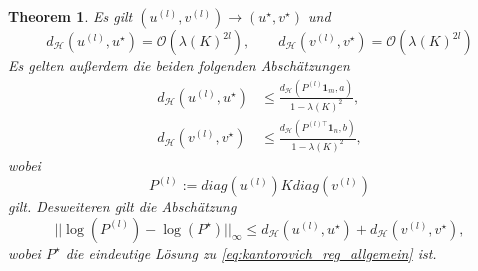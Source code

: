 \documentclass[11pt,a4paper]{article}
\newtheorem{theorem}{Theorem}[subsection]
\numberwithin{equation}{section}
\begin{document}
	\begin{theorem}
		Es gilt $(u^{(l)}, v^{(l)})\to (u^\star, v^\star)$ und
		\begin{equation}
			d_{\mathcal{H}}(u^{(l)}, u^\star) = \mathcal{O}(\lambda(K)^{2l}), \qquad d_\mathcal{H}(v^{(l)},v^\star) = \mathcal{O}(\lambda (K)^{2l}) \label{eq:erstesResThm42}
		\end{equation}
		Es gelten außerdem die beiden folgenden Abschätzungen
		\begin{align}
			d_\mathcal{H} (u^{(l)}, u^\star) &\leq \frac{d_\mathcal{H}(P^{(l)}\boldsymbol{1}_m, a)}{1-\lambda(K)^2}, \label{eq:thm42zweiAbschätzungen1}\\
			d_\mathcal{H} (v^{(l)}, v^\star) &\leq \frac{d_\mathcal{H}(P^{(l)\top}\boldsymbol{1}_n, b)}{1-\lambda(K)^2}, \label{eq:thm42zweiAbschätzungen}		
		\end{align}
		wobei \begin{equation}
			P^{(l)} := diag(u^{(l)})K diag(v^{(l)}) \label{eq:reconstruction_TransportPlan}
		\end{equation}
		gilt. Desweiteren gilt die Abschätzung
		\begin{equation}
			|| \log(P^{(l)}) - \log (P^\star)||_\infty \leq d_\mathcal{H} (u^{(l)}, u^\star) + d_\mathcal{H} (v^{(l)}, v^\star), \label{eq:thm42letzteAbschätzung}
		\end{equation}
		wobei $P^\star$ die eindeutige Lösung zu \autoref{eq:kantorovich_reg_allgemein} ist.
	\end{theorem}
\end{document}
